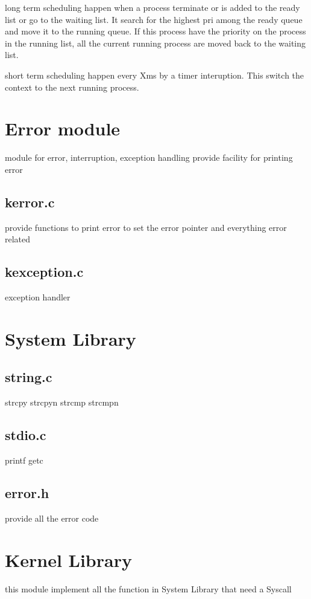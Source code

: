 long term scheduling happen when a process terminate or is added to the ready list or go to the waiting list.
It search for the highest pri among the ready queue and move it to the running queue. If this process have the priority on the process in the running list, all the current running process are moved back to the waiting list.

short term scheduling happen every Xms by a timer interuption. This switch the context to the next running process.

\section{Error module}

module for error, interruption, exception handling
provide facility for printing error

\subsection{kerror.c}

provide functions to print error to set the error pointer and everything error related

\subsection{kexception.c}

exception handler

\section{System Library}

\subsection{string.c}

strcpy
strcpyn
strcmp
strcmpn

\subsection{stdio.c}

printf
getc

\subsection{error.h}

provide all the error code

\section{Kernel Library}

this module implement all the function in System Library that need a Syscall
